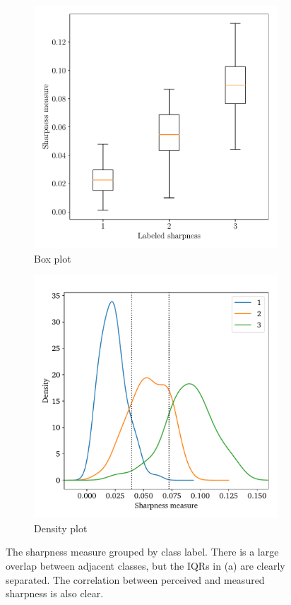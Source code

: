 \begin{figure}[htbp]
  \centering
  \begin{subfigure}[t]{0.48\textwidth}
    \centering
    \includegraphics[width=\textwidth]{figs/box.pdf}
    \caption{Box plot}\label{fig:sharpness-box}
\end{subfigure}%
\hfill
\begin{subfigure}[t]{0.49\textwidth}
  \centering
  \includegraphics[width=\textwidth]{figs/qden.pdf}
  \caption{Density plot}\label{fig:sharpness-qden}
\end{subfigure}
  \caption[Sharpness measure separability]{The sharpness measure grouped by class label. There is a large overlap between adjacent classes, but the IQRs in (a) are clearly separated. The correlation between perceived and measured sharpness is also clear.}\label{fig:sharpness}
\end{figure}

